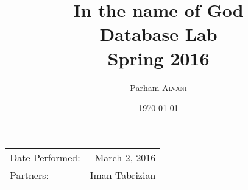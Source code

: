 \documentclass{article}
\title{In the name of God \\ Database Lab \\ Spring 2016} %
\author{Parham \textsc{Alvani}} %
\date{\today} %
\begin{document}
\maketitle %

\begin{center}
    \begin{tabular}{l r}
        Date Performed: & March 2, 2016 \\ %
        Partners: & Iman Tabrizian \\ %
    \end{tabular}
\end{center}


\end{document}
